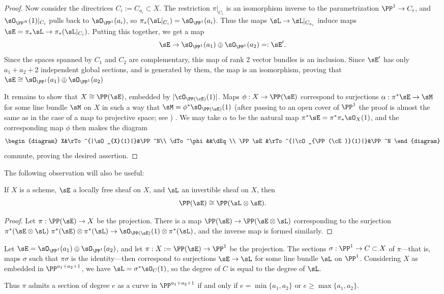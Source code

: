 \begin{proof}
Now consider the directrices $C_{i}:= C_{a_{i}}\subset X$.  The restriction
$\pi|_{C_{i}}$ is an isomorphism inverse to the parametrization $\PP^{1} \to C_{i}$, and $\sO_{\PP^{N}}(1)|_{C_{i}}$ pulls back to $\sO_{\PP^{1}}(a_{i})$, so $\pi_{*}(\sL|_{C_i}) = \sO_{\PP^{1}}(a_{i})$. Thus the maps $\sL \to \sL|_{C_{a_{i}}}$
induce maps $\sE = \pi_{*}\sL \to \pi_{*}( \sL|_{C_i})$. Putting this together, we get a map
$$
\sE \to \sO_{\PP^{1}}(a_{1}) \oplus \sO_{\PP^{1}}(a_{2}) =: \sE'.
$$
Since the spaces spanned by $C_{1}$ and $C_{2}$ are complementary, this map of rank 2 vector bundles is an inclusion. Since $\sE'$ has only $a_{1}+a_{2}+2$ independent global sections, and is generated by them, the map is an isomorphism, proving that $\sE \cong \sO_{\PP^{1}}(a_{1}) \oplus \sO_{\PP^{1}}(a_{2})$

It remains to show that $X \cong \PP(\sE)$, embedded by $|\cO_{\PP(\cE)}(1)|$. Maps $\phi: X \to \PP (\sE)$ correspond to surjections 
$\alpha: \pi^* \sE \to \sM$ for some line bundle $\sM$ on $X$ in such a way that $\sM = \phi^*\sO_{\PP(\sE)}(1)$ (after passing to an open
cover of $\PP^1$ the proof is almost the same as in the case of a map to projective space; see \cite[II.7.12]{Hartshorne1977}) . We may take $\alpha$ to be the 
natural map $\pi^*\sE = \pi^*\pi_*\sO_X(1)$, and the corresponding map $\phi$ then makes the diagram
$$
\begin{diagram}
 X&\rTo^{|\sO_{X}(1)|}&\PP^N\\
\dTo^\phi&&\dEq \\
\PP\sE &\rTo^{|\cO_{\PP(\cE)}(1)|}&\PP^N
\end{diagram}
$$
commute, proving the desired assertion.
\end{proof}
 
The following  observation will also be useful:

\begin{proposition}
If $X$ is a scheme, $\sE$ a locally free sheaf on $X$, and $\sL$ an invertible sheaf on $X$, then
$$
\PP(\sE) \cong \PP(\sL \otimes \sE).
$$
\end{proposition}
\begin{proof} Let $\pi: \PP(\sE)\to X$ be the projection.
There is a map $\PP(\sE) \to \PP(\sE\otimes \sL)$ corresponding to the surjection 
$\pi^*(\sE \otimes\sL) \ \pi^*(\sE) \otimes \pi^*(\sL) \to \sO_{\PP(\sE)}(1) \otimes \pi^*(\sL)$, 
and the inverse map is formed similarly.
\end{proof}

\begin{proposition}
Let $\sE = \sO_{\PP^1}(a_1)\oplus \sO_{\PP^1}(a_2)$, and let $\pi: X:= \PP(\sE) \to \PP^1$ be the projection.
The sections $\sigma:\PP^1 \to C\subset X$ of $\pi$---that is, maps $\sigma$ such that $\pi\sigma$ is the identity---then 
correspond to surjections
$\sE \to \sL$ for some line bundle $\sL$ on $\PP^1$. Considering  $X$ as embedded in 
$\PP^{a_1+a_2+1}$, we have $\sL = \sigma^*\sO_C(1)$, so the degree of $C$ is equal
to the degree of $\sL$.

Thus $\pi$ admits a section of degree $e$ as a curve in $\PP^{a_1+a_2+1}$ if and only if
$e = \min\{a_1,a_2\}$ or $e\geq \max\{a_1, a_2\}$.
\end{proposition}

